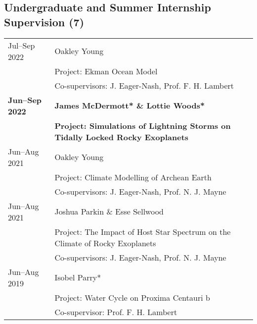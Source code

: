 \documentclass[a4paper, 11pt]{article}
\newcommand{\highlightbold}[1]{\textbf{\textcolor{exeter_bright_green}{#1}}}
\begin{document}
\subsection*{Undergraduate and Summer Internship Supervision (7)}
\begin{tabularx}{\linewidth}{@{}l X@{}}
Jul--Sep 2022 & Oakley Young \\
              & Project: Ekman Ocean Model \\
              & Co-supervisors: J. Eager-Nash, Prof. F. H. Lambert \\
\highlightbold{Jun--Sep 2022} & \highlightbold{James McDermott* \& Lottie Woods*} \\
                          & \highlightbold{Project: Simulations of Lightning Storms on Tidally Locked Rocky Exoplanets} \\
Jun--Aug 2021 & Oakley Young \\
              & Project: Climate Modelling of Archean Earth \\
              & Co-supervisors: J. Eager-Nash, Prof. N. J. Mayne \\
Jun--Aug 2021 & Joshua Parkin \& Esse Sellwood \\
              & Project: The Impact of Host Star Spectrum on the Climate of Rocky Exoplanets \\
              & Co-supervisors: J. Eager-Nash, Prof. N. J. Mayne \\
Jun--Aug 2019 & Isobel Parry* \\
              & Project: Water Cycle on Proxima Centauri b \\
              & Co-supervisor: Prof. F. H. Lambert \\
\end{tabularx}

\end{document}
